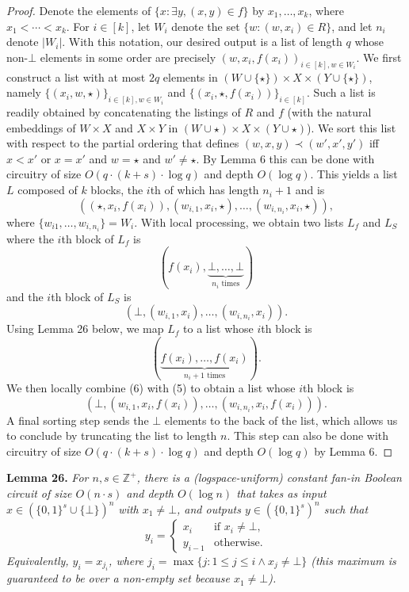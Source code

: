 \documentclass[10pt,a4paper]{article}
\newcommand{\bits}{\{0,1\}}
\newcommand{\ZZ}{\mathbb Z}
\newenvironment{originalresult}[1]{\par\medskip\noindent\textbf{#1.}\itshape}{\par\medskip}
\begin{document}
\begin{proof}
Denote the elements of $\{x:\exists y,(x,y)\in f\}$ by $x_1,\ldots,x_k$, where $x_1<\cdots<x_k$. For $i\in[k]$, let $W_i$ denote the set $\{w:(w,x_i)\in R\}$, and let $n_i$ denote $|W_i|$. With this notation, our desired output is a list of length $q$ whose non-$\bot$ elements in some order are precisely $(w,x_i,f(x_i))_{i\in[k],w\in W_i}$.
We first construct a list with at most $2q$ elements in $(W\cup\{\star\})\times X\times(Y\cup\{\star\})$, namely $\{(x_i,w,\star)\}_{i\in[k],w\in W_i}$ and $\{(x_i,\star,f(x_i))\}_{i\in[k]}$. Such a list is readily obtained by concatenating the listings of $R$ and $f$ (with the natural embeddings of $W\times X$ and $X\times Y$ in $(W\cup\star)\times X\times(Y\cup\star)$).
We sort this list with respect to the partial ordering that defines $(w,x,y)\prec(w',x',y')$ iff $x<x'$ or $x=x'$ and $w=\star$ and $w'\ne\star$. By Lemma 6 this can be done with circuitry of size $O(q\cdot(k+s)\cdot\log q)$ and depth $O(\log q)$. This yields a list $L$ composed of $k$ blocks, the $i$th of which has length $n_i+1$ and is
\[((\star,x_i,f(x_i)),(w_{i,1},x_i,\star),\ldots,(w_{i,n_i},x_i,\star)),\]
where $\{w_{i1},\ldots,w_{i,n_i}\}=W_i$.
With local processing, we obtain two lists $L_f$ and $L_S$ where the $i$th block of $L_f$ is
\[(f(x_i),\underbrace{\bot,\ldots,\bot}_{n_i\text{ times}})\tag{4}\]
and the $i$th block of $L_S$ is
\[(\bot,(w_{i,1},x_i),\ldots,(w_{i,n_i},x_i)).\tag{5}\]
Using Lemma 26 below, we map $L_f$ to a list whose $i$th block is
\[(\underbrace{f(x_i),\ldots,f(x_i)}_{n_i+1\text{ times}}).\tag{6}\]
We then locally combine (6) with (5) to obtain a list whose $i$th block is
\[(\bot,(w_{i,1},x_i,f(x_i)),\ldots,(w_{i,n_i},x_i,f(x_i))).\tag{7}\]
A final sorting step sends the $\bot$ elements to the back of the list, which allows us to conclude by truncating the list to length $n$. This step can also be done with circuitry of size $O(q\cdot(k+s)\cdot\log q)$ and depth $O(\log q)$ by Lemma 6.
\end{proof}
\begin{originalresult}{Lemma 26}
For $n,s\in\ZZ^+$, there is a (logspace-uniform) constant fan-in Boolean circuit of size $O(n\cdot s)$ and depth $O(\log n)$ that takes as input $x\in(\bits^s\cup\{\bot\})^n$ with $x_1\ne\bot$, and outputs $y\in(\bits^s)^n$ such that
\[y_i=\begin{cases}x_i&\text{if }x_i\ne\bot,\\y_{i-1}&\text{otherwise}.\end{cases}\]
Equivalently, $y_i=x_{j_i}$, where $j_i=\max\{j:1\le j\le i\land x_j\ne\bot\}$ (this maximum is guaranteed to be over a non-empty set because $x_1\ne\bot$).
\end{originalresult}
\end{document}
